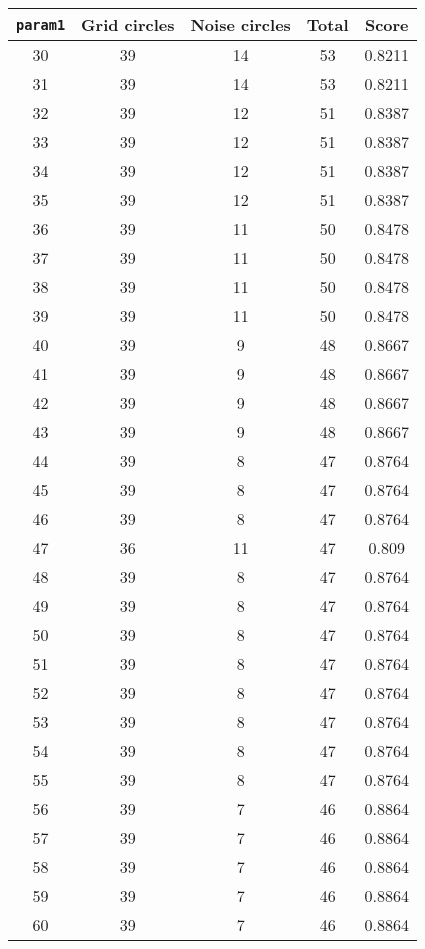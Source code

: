\documentclass[letterpaper, 12pt]{article}
\begin{document}
\begin{longtable}{|c|c|c|c|c|}
\hline
\textbf{\texttt{param1}} & \textbf{Grid circles} & \textbf{Noise circles} & \textbf{Total} & \textbf{Score} \\
\hline
30 & 39 & 14 & 53 & 0.8211 \\
\hline
31 & 39 & 14 & 53 & 0.8211 \\
\hline
32 & 39 & 12 & 51 & 0.8387 \\
\hline
33 & 39 & 12 & 51 & 0.8387 \\
\hline
34 & 39 & 12 & 51 & 0.8387 \\
\hline
35 & 39 & 12 & 51 & 0.8387 \\
\hline
36 & 39 & 11 & 50 & 0.8478 \\
\hline
37 & 39 & 11 & 50 & 0.8478 \\
\hline
38 & 39 & 11 & 50 & 0.8478 \\
\hline
39 & 39 & 11 & 50 & 0.8478 \\
\hline
40 & 39 & 9 & 48 & 0.8667 \\
\hline
41 & 39 & 9 & 48 & 0.8667 \\
\hline
42 & 39 & 9 & 48 & 0.8667 \\
\hline
43 & 39 & 9 & 48 & 0.8667 \\
\hline
44 & 39 & 8 & 47 & 0.8764 \\
\hline
45 & 39 & 8 & 47 & 0.8764 \\
\hline
46 & 39 & 8 & 47 & 0.8764 \\
\hline
47 & 36 & 11 & 47 & 0.809 \\
\hline
48 & 39 & 8 & 47 & 0.8764 \\
\hline
49 & 39 & 8 & 47 & 0.8764 \\
\hline
50 & 39 & 8 & 47 & 0.8764 \\
\hline
51 & 39 & 8 & 47 & 0.8764 \\
\hline
52 & 39 & 8 & 47 & 0.8764 \\
\hline
53 & 39 & 8 & 47 & 0.8764 \\
\hline
54 & 39 & 8 & 47 & 0.8764 \\
\hline
55 & 39 & 8 & 47 & 0.8764 \\
\hline
56 & 39 & 7 & 46 & 0.8864 \\
\hline
57 & 39 & 7 & 46 & 0.8864 \\
\hline
58 & 39 & 7 & 46 & 0.8864 \\
\hline
59 & 39 & 7 & 46 & 0.8864 \\
\hline
60 & 39 & 7 & 46 & 0.8864 \\
\hline

\end{longtable}
\end{document}
